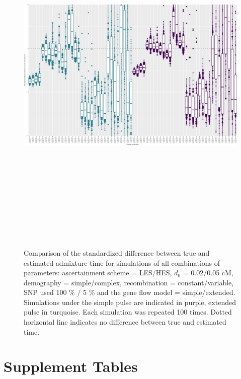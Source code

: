\documentclass[11pt]{article}
\begin{document}
\begin{figure}
\centering
\includegraphics[width=16cm,height=18cm,keepaspectratio]{ATE_Revisions_files/figure-latex/figS2_updated_EP-1.pdf}
\caption{\label{fig:figSGLM_data_EP} Comparison of the standardized difference between true and estimated admixture time for simulations of all combinations of parameters: ascertainment scheme = LES/HES,  $d_{0}$ = 0.02/0.05 cM, demography = simple/complex, recombination = constant/variable, SNP used 100 \% / 5 \% and the gene flow model = simple/extended. Simulations under the simple pulse are indicated in purple, extended pulse in turquoise. Each simulation was repeated 100 times. Dotted horizontal line indicates no difference between true and estimated time.}
\end{figure}

\section{Supplement Tables}
\end{document}
